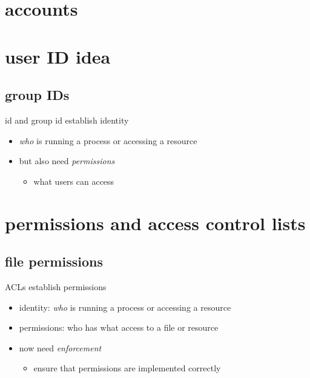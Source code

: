 \section{accounts}


\section{user ID idea}


\subsection{group IDs}


\begin{frame}{id and group id establish identity}
    \begin{itemize}
        \item \textit{who} is running a process or accessing a resource
        \item but also need \textit{permissions}
            \begin{itemize}
            \item what users can access
            \end{itemize}
    \end{itemize}
\end{frame}

\section{permissions and access control lists}
\subsection{file permissions}



\begin{frame}{ACLs establish permissions}
    \begin{itemize}
        \item identity: \textit{who} is running a process or accessing a resource
        \item permissions: who has what access to a file or resource
        \item now need \textit{enforcement}
            \begin{itemize}
            \item ensure that permissions are implemented correctly
            \end{itemize}
    \end{itemize}
\end{frame}

